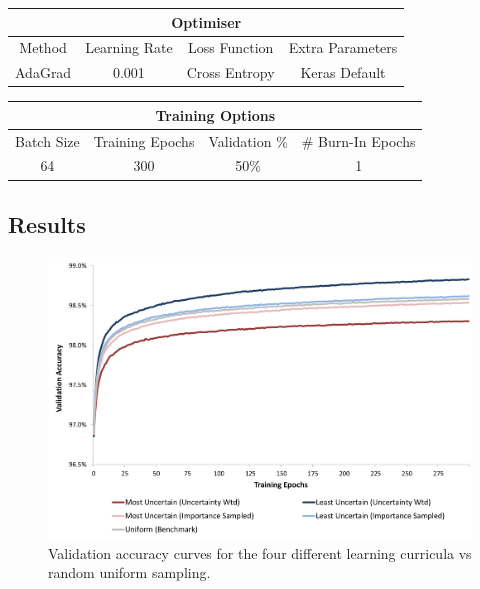\documentclass[a4paper,10.5pt]{article}
\begin{document}
\begin{center}
\begin{tabular}{|c|c|c|c|}
\hline
\multicolumn{4}{|c|}{Optimiser} \\
\hline
Method & Learning Rate & Loss Function & Extra Parameters \\
\hline
AdaGrad & 0.001 & Cross Entropy & Keras Default\\
\hline
\end{tabular}
\end{center}

\begin{center}
\begin{tabular}{|c|c|c|c|}
\hline
\multicolumn{4}{|c|}{Training Options} \\
\hline
Batch Size & Training Epochs & Validation \% & \# Burn-In Epochs \footnotemark \\
\hline
64 & 300 & 50\% & 1\\
\hline
\end{tabular}
\end{center}

\newpage
\subsection*{Results}
\begin{figure}[ht]
\begin{centering}
\includegraphics[scale = 0.35]{ExampleResults.png}
\caption{Validation accuracy curves for the four different learning curricula vs random uniform sampling.}
\end{centering}
\end{figure}
\end{document}

